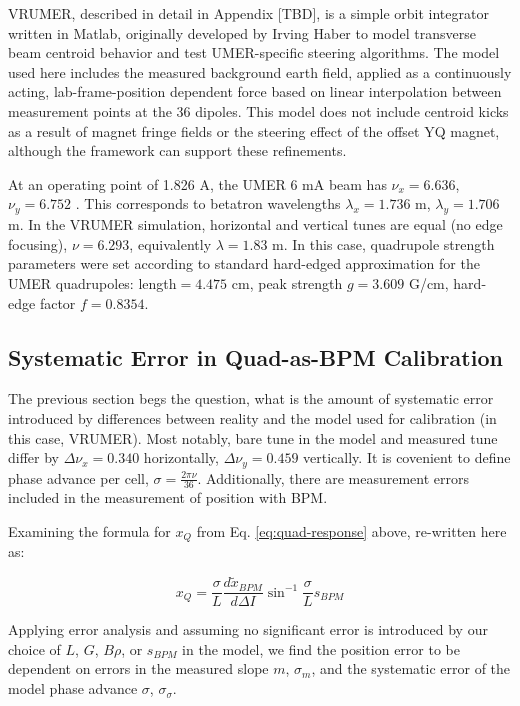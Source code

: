 VRUMER, described in detail in Appendix [TBD], is a simple orbit integrator written in Matlab, originally developed by Irving Haber to model transverse beam centroid behavior and test UMER-specific steering algorithms.
The model used here includes the measured background earth field, applied as a continuously acting, lab-frame-position dependent force based on linear interpolation between measurement points at the 36 dipoles.
This model does not include centroid kicks as a result of magnet fringe fields or the steering effect of the offset YQ magnet, although the framework can support these refinements.

At an operating point of 1.826 A, the UMER 6 mA beam has $\nu_x = 6.636$, $\nu_y=6.752$ \cite{RKnote:2010}. This corresponds to betatron wavelengths $\lambda_x = 1.736$ m, $\lambda_y=1.706$ m.
In the VRUMER simulation, horizontal and vertical tunes are equal (no edge focusing), $\nu=6.293$, equivalently $\lambda = 1.83$ m.
In this case, quadrupole strength parameters were set according to standard hard-edged approximation for the UMER quadrupoles: length$=4.475$ cm, peak strength $g=3.609$ G/cm, hard-edge factor $f=0.8354$.


\subsection{Systematic Error in Quad-as-BPM Calibration} \label{sec:steering:errors}

The previous section begs the question, what is the amount of systematic error introduced by differences between reality and the model used for calibration (in this case, VRUMER). Most notably, bare tune in the model and measured tune differ by $\Delta \nu_x = 0.340$ horizontally, $\Delta \nu_y = 0.459$ vertically. It is covenient to define phase advance per cell, $\sigma = \frac{2\pi\nu}{36}$. Additionally, there are measurement errors included in the measurement of position with BPM.

Examining the formula for $x_Q$ from Eq. \ref{eq:quad-response} above, re-written here as:

\begin{equation} x_Q = \frac{\sigma}{L} \frac{d \tilde{x}_{BPM}}{d \Delta I} \sin^{-1} \frac{\sigma}{L}s_{BPM} \end{equation}


Applying error analysis and assuming no significant error is introduced by our choice of $L$, $G$, $B\rho$, or $s_{BPM}$ in the model, we find the position error to be dependent on errors in the measured slope $m$, $\sigma_m$, and the systematic error of the model phase advance $\sigma$, $\sigma_\sigma$. 

